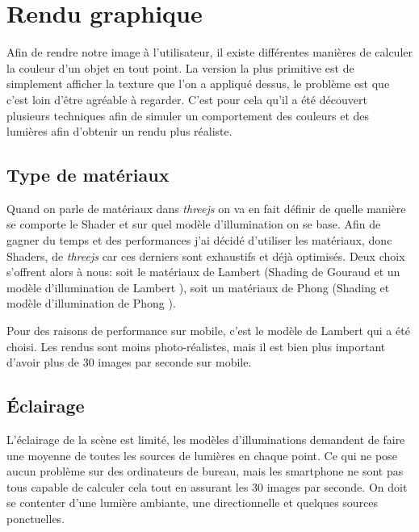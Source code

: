 \section{Rendu graphique}
Afin de rendre notre image à l'utilisateur, il existe différentes manières de calculer la couleur d'un objet en tout point. La version la plus primitive est de simplement afficher la texture que l'on a appliqué dessus, le problème est que c'est loin d'être agréable à regarder. C'est pour cela qu'il a été découvert plusieurs techniques afin de simuler un comportement des couleurs et des lumières afin d'obtenir un rendu plus réaliste.

\subsection{Type de matériaux}
Quand on parle de matériaux dans \textit{threejs} on va en fait définir de quelle manière se comporte le Shader \cite{wiki-shader} et sur quel modèle d'illumination on se base. Afin de gagner du temps et des performances j'ai décidé d'utiliser les matériaux, donc Shaders, de \textit{threejs} car ces derniers sont exhaustifs et déjà optimisés. Deux choix s'offrent alors à nous: soit le matériaux de Lambert (Shading de Gouraud \cite{wiki-gouraud} et un modèle d'illumination de Lambert \cite{wiki-lambert}), soit un matériaux de Phong (Shading et modèle d'illumination de Phong \cite{wiki-phong-shading} \cite{wiki-phong-reflectance}).

Pour des raisons de performance sur mobile, c'est le modèle de Lambert qui a été choisi. Les rendus sont moins photo-réalistes, mais il est bien plus important d'avoir plus de 30 images par seconde sur mobile.


\subsection{Éclairage}
L'éclairage de la scène est limité, les modèles d'illuminations demandent de faire une moyenne de toutes les sources de lumières en chaque point. Ce qui ne pose aucun problème sur des ordinateurs de bureau, mais les smartphone ne sont pas tous capable de calculer cela tout en assurant les 30 images par seconde. On doit se contenter d'une lumière ambiante, une directionnelle et quelques sources ponctuelles. 